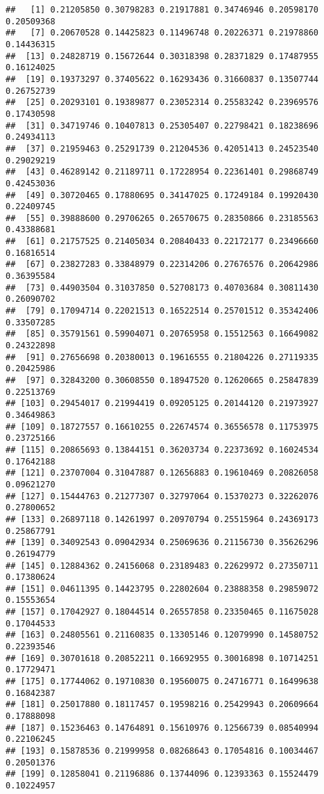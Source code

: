 \documentclass[
]{article}
\begin{document}
\begin{verbatim}
##   [1] 0.21205850 0.30798283 0.21917881 0.34746946 0.20598170 0.20509368
##   [7] 0.20670528 0.14425823 0.11496748 0.20226371 0.21978860 0.14436315
##  [13] 0.24828719 0.15672644 0.30318398 0.28371829 0.17487955 0.16124025
##  [19] 0.19373297 0.37405622 0.16293436 0.31660837 0.13507744 0.26752739
##  [25] 0.20293101 0.19389877 0.23052314 0.25583242 0.23969576 0.17430598
##  [31] 0.34719746 0.10407813 0.25305407 0.22798421 0.18238696 0.24934113
##  [37] 0.21959463 0.25291739 0.21204536 0.42051413 0.24523540 0.29029219
##  [43] 0.46289142 0.21189711 0.17228954 0.22361401 0.29868749 0.42453036
##  [49] 0.30720465 0.17880695 0.34147025 0.17249184 0.19920430 0.22409745
##  [55] 0.39888600 0.29706265 0.26570675 0.28350866 0.23185563 0.43388681
##  [61] 0.21757525 0.21405034 0.20840433 0.22172177 0.23496660 0.16816514
##  [67] 0.23827283 0.33848979 0.22314206 0.27676576 0.20642986 0.36395584
##  [73] 0.44903504 0.31037850 0.52708173 0.40703684 0.30811430 0.26090702
##  [79] 0.17094714 0.22021513 0.16522514 0.25701512 0.35342406 0.33507285
##  [85] 0.35791561 0.59904071 0.20765958 0.15512563 0.16649082 0.24322898
##  [91] 0.27656698 0.20380013 0.19616555 0.21804226 0.27119335 0.20425986
##  [97] 0.32843200 0.30608550 0.18947520 0.12620665 0.25847839 0.22513769
## [103] 0.29454017 0.21994419 0.09205125 0.20144120 0.21973927 0.34649863
## [109] 0.18727557 0.16610255 0.22674574 0.36556578 0.11753975 0.23725166
## [115] 0.20865693 0.13844151 0.36203734 0.22373692 0.16024534 0.17642188
## [121] 0.23707004 0.31047887 0.12656883 0.19610469 0.20826058 0.09621270
## [127] 0.15444763 0.21277307 0.32797064 0.15370273 0.32262076 0.27800652
## [133] 0.26897118 0.14261997 0.20970794 0.25515964 0.24369173 0.25867791
## [139] 0.34092543 0.09042934 0.25069636 0.21156730 0.35626296 0.26194779
## [145] 0.12884362 0.24156068 0.23189483 0.22629972 0.27350711 0.17380624
## [151] 0.04611395 0.14423795 0.22802604 0.23888358 0.29859072 0.15553654
## [157] 0.17042927 0.18044514 0.26557858 0.23350465 0.11675028 0.17044533
## [163] 0.24805561 0.21160835 0.13305146 0.12079990 0.14580752 0.22393546
## [169] 0.30701618 0.20852211 0.16692955 0.30016898 0.10714251 0.17729471
## [175] 0.17744062 0.19710830 0.19560075 0.24716771 0.16499638 0.16842387
## [181] 0.25017880 0.18117457 0.19598216 0.25429943 0.20609664 0.17888098
## [187] 0.15236463 0.14764891 0.15610976 0.12566739 0.08540994 0.22106245
## [193] 0.15878536 0.21999958 0.08268643 0.17054816 0.10034467 0.20501376
## [199] 0.12858041 0.21196886 0.13744096 0.12393363 0.15524479 0.10224957

\end{verbatim}
\end{document}
